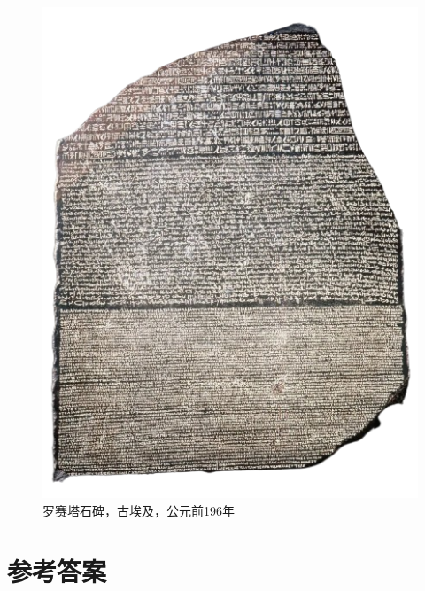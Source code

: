 \documentclass[b5paper]{ctexart}
\begin{document}
\begin{figure}[htbp]
 \centering
 \includegraphics[scale=0.4]{img/rosetta-stone}
 \caption{罗赛塔石碑，古埃及，公元前196年}
 \label{fig:rosetta-stone}
\end{figure}


\ifx\wholebook\relax \else
\section{参考答案}
\shipoutAnswer

\begin{thebibliography}{99}




\end{thebibliography}

\expandafter\enddocument

\fi
\end{document}
